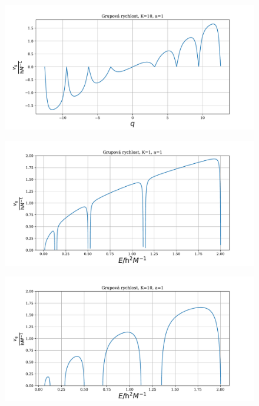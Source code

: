 \documentclass[10pt,a4paper]{article}
\begin{document}
\begin{figure}[h!]
    \centering
    \includegraphics[scale=0.65]{grupova10_q.pdf}
    \label{}
\end{figure}

\begin{figure}[h!]
    \centering
    \includegraphics[scale=0.65]{grupova1_E.pdf}
    \label{}
\end{figure}

\begin{figure}[h!]
    \centering
    \includegraphics[scale=0.65]{grupova10_E.pdf}
    \label{}
\end{figure}
\end{document}
